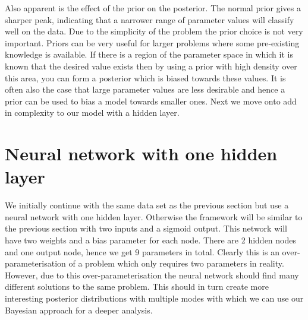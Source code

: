 \documentclass[review]{siamart190516}
\begin{document}
Also apparent is the effect of the prior on the posterior. The normal prior gives a sharper peak, indicating that a narrower range of parameter values will classify well on the data. Due to the simplicity of the problem the prior choice is not very important.
\newline Priors can be very useful for larger problems where some pre-existing knowledge is available. If there is a region of the parameter space in which it is known that the desired value exists then by using a prior with high density over this area, you can form a posterior which is biased towards these values. It is often also the case that large parameter values are less desirable and hence a prior can be used to bias a model towards smaller ones. Next we move onto add in complexity to our model with a hidden layer.

\section{Neural network with one hidden layer}
We initially continue with the same data set as the previous section but use a neural network with one hidden layer.
\newline
Otherwise the framework will be similar to the previous section with two inputs and a sigmoid output. This network will have two weights and a bias parameter for each node. There are 2 hidden nodes and one output node, hence we get 9 parameters in total. Clearly this is an over-parameterisation of a problem which only requires two parameters in reality. However, due to this over-parameterisation the neural network should find many different solutions to the same problem. This should in turn create more interesting posterior distributions with multiple modes with which we can use our Bayesian approach for a deeper analysis.
\end{document}
